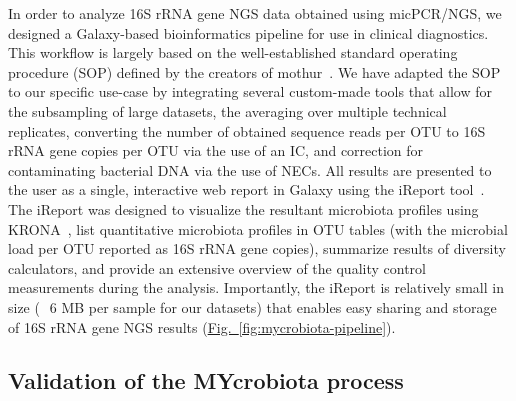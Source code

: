 In order to analyze 16S rRNA gene NGS data obtained using micPCR/NGS, we designed a Galaxy-based bioinformatics pipeline for use in clinical diagnostics. This workflow is largely based on the well-established standard operating procedure (SOP) defined by the creators of mothur~\cite{kozich2013development}. We have adapted the SOP to our specific use-case by integrating several custom-made tools that allow for the subsampling of large datasets, the averaging over multiple technical replicates, converting the number of obtained sequence reads per OTU to 16S rRNA gene copies per OTU via the use of an IC, and correction for contaminating bacterial DNA via the use of NECs. All results are presented to the user as a single, interactive web report in Galaxy using the iReport tool~\cite{hiltemann2014ireport}. The iReport was designed to visualize the resultant microbiota profiles using KRONA~\cite{ondov2011interactive}, list quantitative microbiota profiles in OTU tables (with the microbial load per OTU reported as 16S rRNA gene copies), summarize results of diversity calculators, and provide an extensive overview of the quality control measurements during the analysis. Importantly, the iReport is relatively small in size (~ 6 MB per sample for our datasets) that enables easy sharing and storage of 16S rRNA gene NGS results (\hyperref[fig:mycrobiota-pipeline]{Fig.~\ref{fig:mycrobiota-pipeline}}).


\subsection*{Validation of the MYcrobiota process}

